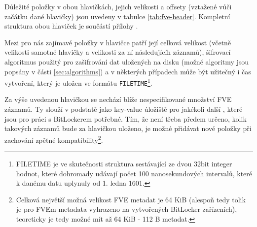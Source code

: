 Důležité položky v obou hlavičkách, jejich velikosti a offsety (vztažené vůči začátku dané hlavičky) jsou uvedeny v tabulce \ref{tab:fve-header}. Kompletní struktura obou hlaviček je součástí přílohy .


Mezi pro nás zajímavé položky v hlavičce patří její celková velikost (včetně velikosti samotné hlavičky a velikosti za ní následujícíh záznamů), šifrovací algoritmus použitý pro zašifrování dat uložených na disku (možné algoritmy jsou popsány v části \ref{sec:algorithms}) a v některých případech může být užitečný i čas vytvoření, který je uložen ve formátu \texttt{FILETIME}\footnote{FILETIME je ve skutečnosti struktura sestávající ze dvou 32bit integer hodnot, které dohromady udávají počet 100 nanosekundových intervalů, které k danému datu uplynuly od 1. ledna 1601.\cite{Zxwr6wjYZUQ6z8Yp}}.

\label{sec:fve-metadata-entry}

Za výše uvedenou hlavičkou se nechází blíže nespecifikované množství FVE záznamů. Ty slouží v podstatě jako key-value úložiště pro jakékoli další , které jsou pro práci s BitLockerem potřebné. Tím, že není třeba předem určeno, kolik takových záznamů bude za hlavičkou uloženo, je možné přidávat nové položky při zachování zpětné kompatibility\footnote{Celková největší možná velikost FVE metadat je 64 KiB (alespoň tedy tolik je pro FVEm metadata vyhrazeno na vytvořených BitLocker zařízeních), teoreticky je tedy možné mít až 64 KiB - 112 B metadat.}.

